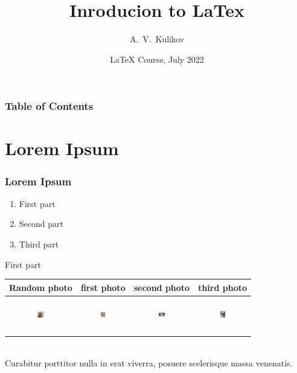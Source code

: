 \documentclass{beamer}
\title[cats. cats. cats]
{Inroducion to LaTex}
\author[Kulikov]
{A.~V.~Kulikov\inst{1}}
\institute[HSE]
{
    \inst{1}
    Faculty of Computer Science \\
    Hse University
}
\date[27 07 2022] %
{LaTeX Course, July 2022}
\begin{document}
\frame{\titlepage}

\begin{frame}
\frametitle{Table of Contents}
\tableofcontents
\end{frame}

\section{Lorem Ipsum}

\begin{frame}
\frametitle{Lorem Ipsum}
\begin{enumerate}
\item First part
\item Second part
\item Third part
\end{enumerate}
\end{frame}
\begin{frame}{First part}
\begin{tabular}{c | c | c | c}
    Random photo & first photo & second photo & third photo \\ \hline
    \includegraphics[width=0.1\textwidth, height=15mm]{images/8.jpg} & \includegraphics[width=0.1\textwidth, height=15mm]{images/1.jpg} & \includegraphics[width=0.1\textwidth, height=15mm]{images/2.jpg} & \includegraphics[width=0.1\textwidth, height=15mm]{images/3.jpg} \\
\end{tabular} \\
    Curabitur porttitor nulla in erat viverra, posuere scelerisque massa venenatis.
\end{frame}
\end{document}
